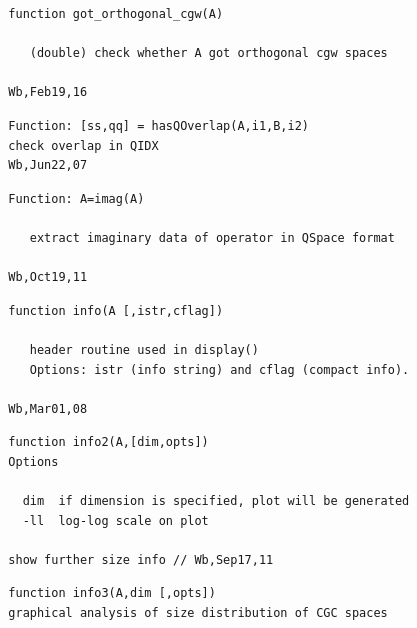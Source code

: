 \documentclass[twoside,12pt]{article}
\begin{document}
\pagebreak[3]



\begin{verbatim}
  function got_orthogonal_cgw(A)
 
     (double) check whether A got orthogonal cgw spaces
 
  Wb,Feb19,16
\end{verbatim}

\pagebreak[3]



\begin{verbatim}
  Function: [ss,qq] = hasQOverlap(A,i1,B,i2)
  check overlap in QIDX
  Wb,Jun22,07
\end{verbatim}

\pagebreak[3]



\begin{verbatim}
  Function: A=imag(A)
 
     extract imaginary data of operator in QSpace format
 
  Wb,Oct19,11
\end{verbatim}

\pagebreak[3]



\begin{verbatim}
  function info(A [,istr,cflag])
 
     header routine used in display()
     Options: istr (info string) and cflag (compact info).
 
  Wb,Mar01,08
\end{verbatim}

\pagebreak[3]



\begin{verbatim}
  function info2(A,[dim,opts])
  Options
  
    dim  if dimension is specified, plot will be generated
    -ll  log-log scale on plot
  
  show further size info // Wb,Sep17,11
\end{verbatim}

\pagebreak[3]



\begin{verbatim}
  function info3(A,dim [,opts])
  graphical analysis of size distribution of CGC spaces
\end{verbatim}
\end{document}
